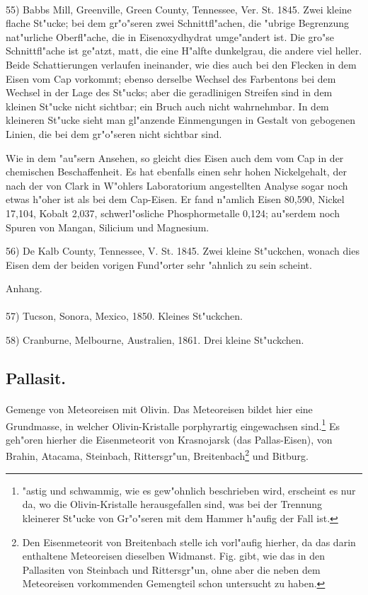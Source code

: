 \documentclass[a4paper, 11pt, oneside]{article}
\begin{document}
\paragraph{}
55) Babbs Mill, Greenville, Green County, Tennessee, Ver. St. 1845. Zwei kleine flache St"ucke; bei dem gr"o"seren zwei Schnittfl"achen, die "ubrige Begrenzung nat"urliche Oberfl"ache, die in Eisenoxydhydrat umge"andert ist. Die gro"se Schnittfl"ache ist ge"atzt, matt, die eine H"alfte dunkelgrau, die andere viel heller. Beide Schattierungen verlaufen ineinander, wie dies auch bei den Flecken in dem Eisen vom Cap vorkommt; ebenso derselbe Wechsel des Farbentons bei dem Wechsel in der Lage des St"ucks; aber die geradlinigen Streifen sind in dem kleinen St"ucke nicht sichtbar; ein Bruch auch nicht wahrnehmbar. In dem kleineren St"ucke sieht man gl"anzende Einmengungen in Gestalt von gebogenen Linien, die bei dem gr"o"seren nicht sichtbar sind.

Wie in dem "au"sern Ansehen, so gleicht dies Eisen auch dem vom Cap in der chemischen Beschaffenheit. Es hat ebenfalls einen sehr hohen Nickelgehalt, der nach der von Clark in W"ohlers Laboratorium angestellten Analyse sogar noch etwas h"oher ist als bei dem Cap-Eisen. Er fand n"amlich Eisen 80,590, Nickel 17,104, Kobalt 2,037, schwerl"osliche Phosphormetalle 0,124; au"serdem noch Spuren von Mangan, Silicium und Magnesium.

56) De Kalb County, Tennessee, V. St. 1845. Zwei kleine St"uckchen, wonach dies Eisen dem der beiden vorigen Fund"orter sehr "ahnlich zu sein scheint.
\begin{center}
Anhang. 
\end{center}
\paragraph{}
57) Tucson, Sonora, Mexico, 1850. Kleines St"uckchen.

58) Cranburne, Melbourne, Australien, 1861. Drei kleine St"uckchen.
\subsection{Pallasit.}
\paragraph{}
Gemenge von Meteoreisen mit Olivin. Das Meteoreisen bildet hier eine Grundmasse, in welcher Olivin-Kristalle porphyrartig eingewachsen sind.\footnote{"astig und schwammig, wie es gew"ohnlich beschrieben wird, erscheint es nur da, wo die Olivin-Kristalle herausgefallen sind, was bei der Trennung kleinerer St"ucke von Gr"o"seren mit dem Hammer h"aufig der Fall ist.} Es geh"oren hierher die Eisenmeteorit von Krasnojarsk (das Pallas-Eisen), von Brahin, Atacama, Steinbach, Rittersgr"un, Breitenbach\footnote{Den Eisenmeteorit von Breitenbach stelle ich vorl"aufig hierher, da das darin enthaltene Meteoreisen dieselben Widmanst. Fig. gibt, wie das in den Pallasiten von Steinbach und Rittersgr"un, ohne aber die neben dem Meteoreisen vorkommenden Gemengteil schon untersucht zu haben.} und Bitburg.
\end{document}
